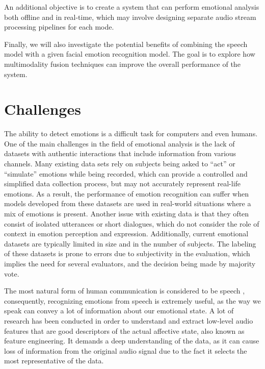 An additional objective is to create a system that can perform emotional analysis both offline and in real-time, which may involve designing separate audio stream processing pipelines for each mode.

Finally, we will also investigate the potential benefits of combining the speech model with a given facial emotion recognition model. The goal is to explore how multimodality fusion techniques can improve the overall performance of the system.


\section{Challenges}

The ability to detect emotions is a difficult task for computers and even humans. One of the main challenges in the field of emotional analysis is the lack of datasets with authentic interactions that include information from various channels. Many existing data sets rely on subjects being asked to “act” or “simulate” emotions while being recorded, which can provide a controlled and simplified data collection process, but may not accurately represent real-life emotions. As a result, the performance of emotion recognition can suffer when models developed from these datasets are used in real-world situations where a mix of emotions is present. Another issue with existing data is that they often consist of isolated utterances or short dialogues, which do not consider the role of context in emotion perception and expression. Additionally, current emotional datasets are typically limited in size and in the number of subjects. The labeling of these datasets is prone to errors due to subjectivity in the evaluation, which implies the need for several evaluators, and the decision being made by majority vote.

The most natural form of human communication is considered to be speech \cite{Deng2006}, consequently, recognizing emotions from speech is extremely useful, as the way we speak can convey a lot of information about our emotional state. A lot of research has been conducted in order to understand and extract low-level audio features that are good descriptors of the actual affective state, also known as feature engineering. It demands a deep understanding of the data, as it can cause loss of information from the original audio signal due to the fact it selects the most representative of the data.

